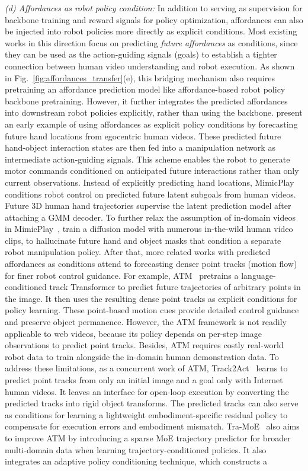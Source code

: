 \documentclass[Afour,sageh,times]{sagej}
\begin{document}
 \textit{(d) Affordances as robot policy condition:} 
In addition to serving as supervision for backbone training and reward signals for policy optimization, affordances can also be injected into robot policies more directly as explicit conditions. Most existing works in this direction focus on predicting \textit{future affordances} as conditions, since they can be used as the action-guiding signals (goals) to establish a tighter connection between human video understanding and robot execution. As shown in Fig.~\ref{fig:affordances_transfer}(e), this bridging mechanism also requires pretraining an affordance prediction model like affordance-based robot policy backbone pretraining. However, it further integrates the predicted affordances into downstream robot policies explicitly, rather than using the backbone. \cite{lee2017learning} present an early example of using affordances as explicit policy conditions by forecasting future hand locations from egocentric human videos. These predicted future hand-object interaction states are then fed into a manipulation network as intermediate action-guiding signals. This scheme enables the robot to generate motor commands conditioned on anticipated future interactions rather than only current observations. Instead of explicitly predicting hand locations, MimicPlay~\citep{wang2023mimicplay} conditions robot control on predicted future latent subgoals from human videos. Future 3D human hand trajectories supervise the latent prediction model after attaching a GMM decoder. To further relax the assumption of in-domain videos in MimicPlay~\citep{wang2023mimicplay}, \cite{bharadhwaj2023towards} train a diffusion model with numerous in-the-wild human video clips, to hallucinate future hand and object masks that condition a separate robot manipulation policy. After that, more related works with predicted affordances as conditions attend to forecasting denser point tracks (motion flow) for finer robot control guidance. For example, ATM~\citep{wen2023any} pretrains a language-conditioned track Transformer to predict future trajectories of arbitrary points in the image. It then uses the resulting dense point tracks as explicit conditions for policy learning. These point-based motion cues provide detailed control guidance and preserve object permanence. However, the ATM framework is not readily applicable to web videos, because its policy depends on per-step image observations to predict point tracks. Besides, ATM requires costly real-world robot data to train alongside the in-domain human demonstration data. To address these limitations, as a concurrent work of ATM, Track2Act~\citep{bharadhwaj2024track2act} learns to predict point tracks from only an initial image and a goal only with Internet human videos. It leaves an interface for open-loop execution by converting the predicted tracks into rigid object transforms. The predicted tracks can also serve as conditions for learning a lightweight embodiment-specific residual policy to compensate for execution errors and embodiment mismatch. Tra-MoE~\citep{yang2025tra} also aims to improve ATM by introducing a sparse MoE trajectory predictor for broader multi-domain data when learning trajectory-conditioned policies. It also integrates an adaptive policy conditioning technique, which constructs a 
\end{document}
